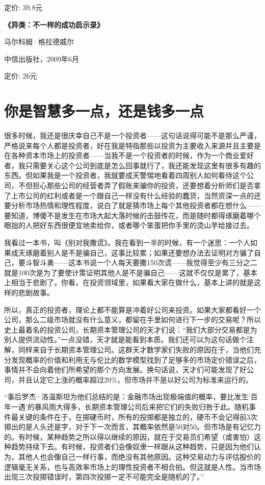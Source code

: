定价: 39.8元

\textbf{《异类：不一样的成功启示录》}

马尔科姆·格拉德威尔

中信出版社，2009年6月

定价: 26元

\section{你是智慧多一点，还是钱多一点}

很多时候，我还是很庆幸自己不是一个投资者------这句话说得可能不是那么严谨，严格说来每个人都是投资者，好在我是特指那些以投资为主要收入来源并且主要是在各种资本市场上的投资者------当我不是一个投资者的时候，作为一个商业爱好者，我只需要关心这个公司到底是怎么回事就行了，我还能发现这里有很多有趣的东西。但如果我是一个投资者，我就要成天警惕地看着四周别人如何看待这个公司，不但担心那些公司的经营者弄了假账来骗你的投资，还要想着分析师们是否拿了上市公司的红利或者是一个跟自己一样没有什么经验的蠢货，当然资深一点的还要分析市场热情和理性程度，说白了就是猜市场上每个其他投资者都在想什么------要知道，博傻不是发生在市场大起大落时候的击鼓传花，而是随时都得琢磨着哪个眼拙的人把好东西很便宜地卖给你，或者哪个笨蛋把你手里的烫山芋给接过去。

我看过一本书，叫《别对我撒谎》。我在看到一半的时候，有一个迷思：一个人如果成天琢磨着别人是不是骗自己，这事比较累；如果还要想办法去证明对方骗了自己，要斗智斗勇------这本书说一个人每天要撒150次谎------我觉得至少有三分之二就是100次是为了要使计策证明其他人是不是骗自己------这就不仅仅是累了，基本上相当于悲剧了。你看，在投资领域里，如果看大家在做什么，基本上讲的就是这样的悲剧故事。

所以，真正的投资者，理论上都不能算是冲着好公司来投资。如果大家都看好一个公司，那么二级市场就没有什么意义，都留在手里如何进行下一步的交易呢？所以史上最着名的投资公司，长期资本管理公司的天才们说：``我们大部分交易都是为别人提供流动性。''一点没错，天才就是能看到本质。我们还可以为这句话做个注解，同样来自于长期资本管理公司。这群天才数学家们失败的原因在于，当他们充分发现概率的价值和利用无与伦比的数学模型找到了足够多的市场定价错误之后，事情并不会向着他们所希望的那个方向发展。换句话说，天才们可能发现了好公司，并且认定它上涨的概率超过20\%，但市场并不是以好公司为标准来运行的。

``事后罗杰·洛温斯坦为他们总结的是：金融市场出现极端值的概率，要比发生`百年一遇'的暴风雨大得多，长期资本管理公司后来把它们的失败归咎于此。随机事件最关键的条件在于，在掷硬币时，所有的投掷都是独立的，硬币不会记得前3次掷出的是人头还是字，对于下一次而言，其概率依然是50对50。但市场是有记忆力的。有时候，某种趋势之所以得以继续的原因，就在于交易员们希望（或害怕）这种趋势持续下去。有时候，投资者们会像奴隶一样跟从这种趋势，只是因为他们认为，其他人也会像自己一样行事，而绝没有其他原因。这种交易动力与评估股价的逻辑毫无关系，也与高效率市场上的理性投资者不相合拍。但这就是人性。当市场出现三次投掷错误时，第四次投掷一定不可能完全是随机的了。''

